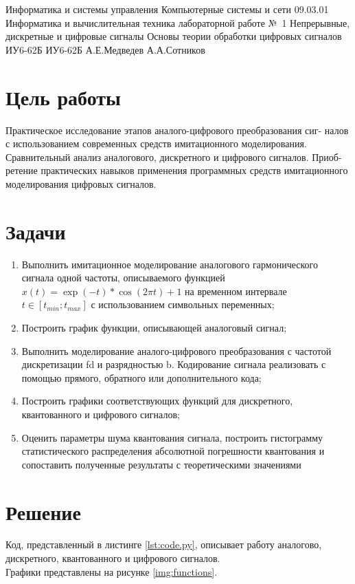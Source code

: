 \documentclass{bmstu}
\begin{document}
\makereporttitle
    {Информатика и системы управления} %
    {Компьютерные системы и сети} %
    {09.03.01 Информатика и вычислительная техника} %
    {лабораторной работе №~1} %
    {Непрерывные, дискретные и цифровые сигналы} %
    {Основы теории обработки цифровых сигналов} %
    {} %
    {ИУ6-62Б} %
    {
    	{ИУ6-62Б}
    	{А.Е.Медведев} %
    	{А.А.Сотников} %
    } 

\section*{Цель работы}
Практическое исследование этапов аналого-цифрового преобразования сиг-
налов с использованием современных средств имитационного моделирования.
Сравнительный анализ аналогового, дискретного и цифрового сигналов. Приоб-
ретение практических навыков применения программных средств имитационного
моделирования цифровых сигналов.

\section*{Задачи}
\begin{enumerate} 
\item Выполнить имитационное моделирование аналогового гармонического сигнала одной частоты, описываемого функцией $x(t) = \exp(-t) * \cos(2\pi t) + 1$ на временном интервале $t \in [t_{min} ; t_{max} ]$ с использованием символьных переменных;
\item Построить график функции, описывающей аналоговый сигнал;
\item Выполнить моделирование аналого-цифрового преобразования с частотой дискретизации fd и разрядностью b. Кодирование сигнала реализовать с помощью прямого, обратного или дополнительного кода;
\item Построить графики соответствующих функций для дискретного, квантованного и цифрового сигналов;
\item Оценить параметры шума квантования сигнала, построить гистограмму статистического распределения абсолютной погрешности квантования и сопоставить полученные результаты с теоретическими значениями
\end{enumerate}

\newpage

\section*{Решение}
Код, представленный в листинге \ref{lst:code.py}, описывает работу аналогово, дискретного, квантованного и цифрового сигналов. \\
Графики представлены на рисунке \ref{img:functions}.
\end{document}
